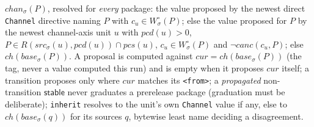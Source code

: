 \documentclass[sigconf,nonacm]{acmart}
\newcommand{\code}[1]{\texttt{#1}}
\begin{document}
\begin{definition}[channels]
\label{def:chan}
$\mathit{chan}_\sigma(P)$, resolved for \emph{every} package: the value
proposed by the newest direct \code{Channel} directive naming $P$ with
$c_u \in W^\circ_\sigma(P)$; else the value proposed for $P$ by the newest
channel-axis unit $u$ with $\mathit{pcd}(u) > 0$, $P \in
R(\mathit{src}_\sigma(u), \mathit{pcd}(u)) \cap \mathit{pcs}(u)$,
$c_u \in W^\circ_\sigma(P)$ and $\lnot\mathit{canc}(c_u,P)$; else
$\mathit{ch}(\mathit{base}_\sigma(P))$. A proposal is computed against
$\mathit{cur} = \mathit{ch}(\mathit{base}_\sigma(P))$ (the tag, never
a value computed this run) and is empty when it proposes
$\mathit{cur}$ itself; a transition proposes only where $\mathit{cur}$
matches its \code{<from>}; a \emph{propagated} non-transition
$\mathsf{stable}$ never graduates a prerelease package (graduation must
be deliberate); \code{inherit} resolves to the unit's own
\code{Channel} value if any, else to
$\mathit{ch}(\mathit{base}_\sigma(q))$ for its sources $q$, bytewise
least name deciding a disagreement.
\end{definition}
\end{document}
